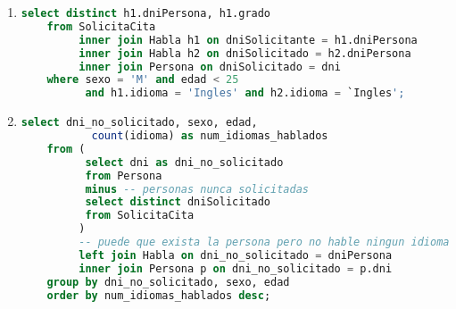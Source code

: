 \begin{enumerate}
	\item 
	\begin{lstlisting}[language=sql]
	select distinct h1.dniPersona, h1.grado
	from SolicitaCita
		 inner join Habla h1 on dniSolicitante = h1.dniPersona
		 inner join Habla h2 on dniSolicitado = h2.dniPersona
		 inner join Persona on dniSolicitado = dni
	where sexo = 'M' and edad < 25 
		  and h1.idioma = 'Ingles' and h2.idioma = `Ingles';\end{lstlisting}
	
	\item
	\begin{lstlisting}[language=sql]
	select dni_no_solicitado, sexo, edad, 
		   count(idioma) as num_idiomas_hablados
	from ( 
		  select dni as dni_no_solicitado
		  from Persona
		  minus -- personas nunca solicitadas
		  select distinct dniSolicitado
		  from SolicitaCita
		 )
		 -- puede que exista la persona pero no hable ningun idioma
		 left join Habla on dni_no_solicitado = dniPersona
		 inner join Persona p on dni_no_solicitado = p.dni
	group by dni_no_solicitado, sexo, edad
	order by num_idiomas_hablados desc;\end{lstlisting}
\end{enumerate}